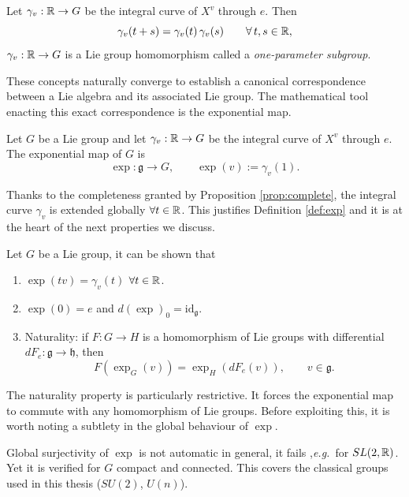 \begin{proposition}\label{prop:one-param}
	Let $\gamma_v:\mathbb{R}\to G$ be the integral curve of $X^v$ through $e$. Then
	\[
	\gamma_v(t+s) = \gamma_v(t)\,\gamma_v(s) \qquad \forall\, t,s \in \mathbb{R},
	\]
	$\gamma_v :\mathbb{R} \to G$ is a Lie group homomorphism called a \emph{one-parameter subgroup}.
\end{proposition}

These concepts naturally converge to establish a canonical correspondence between a Lie algebra and its associated Lie group. The mathematical tool enacting this exact correspondence is the exponential map.

\begin{definition}\label{def:exp}
	Let $G$ be a Lie group and let $\gamma_v:\mathbb{R} \to G$ be the integral curve of $X^v$ through $e$. The exponential map of $G$ is
	\[
	\exp: \mathfrak{g} \to G, \qquad \exp(v) := \gamma_v(1).
	\]
\end{definition}

Thanks to the completeness granted by Proposition \ref{prop:complete}, the integral curve $\gamma_v$ is extended globally $\forall t \in \mathbb{R}$. This justifies Definition \ref{def:exp} and it is at the heart of the next properties we discuss.

\begin{proposition}\label{prop:exp-props}
	Let $G$ be a Lie group, it can be shown that
	\begin{enumerate}
		\item $\exp(tv) = \gamma_v(t)$ $\forall t\in\mathbb{R}$.
		\item $\exp(0)=e$ and $d(\exp)_0 = \mathrm{id}_{\mathfrak g}$.
		\item Naturality: if $F:G\to H$ is a homomorphism of Lie groups with differential $dF_e:\mathfrak g\to\mathfrak h$, then
		\[
		F(\exp_G(v)) = \exp_H(dF_e(v)), \qquad v\in\mathfrak g.
		\]
	\end{enumerate}
\end{proposition}

The naturality property is particularly restrictive. It forces the exponential map to commute with any homomorphism of Lie groups. Before exploiting this, it is worth noting a subtlety in the global behaviour of $\exp$.

\begin{remark}
	Global surjectivity of $\exp$ is not automatic in general, it fails ,\textit{e.g.}\, for $SL(2,\mathbb{R})$. Yet it is verified for $G$ compact and connected. This covers the classical groups used in this thesis ($SU(2)$, $U(n)$).
\end{remark}

